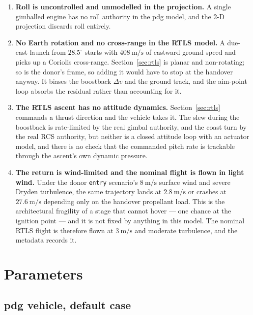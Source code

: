 \documentclass[11pt,a4paper]{article}
\newcommand{\code}[1]{\texttt{#1}}
\begin{document}
\begin{enumerate}
\item \textbf{Roll is uncontrolled and unmodelled in the projection.} A single
  gimballed engine has no roll authority in the pdg model, and the 2-D
  projection discards roll entirely.

\item \textbf{No Earth rotation and no cross-range in the RTLS model.} A due-east
  launch from $28.5^\circ$ starts with $408\ \mathrm{m/s}$ of eastward ground
  speed and picks up a Coriolis cross-range. Section~\ref{sec:rtls} is planar and
  non-rotating; so is the donor's frame, so adding it would have to stop at the
  handover anyway. It biases the boostback $\Delta v$ and the ground track, and
  the aim-point loop absorbs the residual rather than accounting for it.

\item \textbf{The RTLS ascent has no attitude dynamics.} Section~\ref{sec:rtls}
  commands a thrust direction and the vehicle takes it. The slew during the
  boostback is rate-limited by the real gimbal authority, and the coast turn by
  the real RCS authority, but neither is a closed attitude loop with an actuator
  model, and there is no check that the commanded pitch rate is trackable
  through the ascent's own dynamic pressure.

\item \textbf{The return is wind-limited and the nominal flight is flown in
  light wind.} Under the donor \code{entry} scenario's $8\ \mathrm{m/s}$ surface
  wind and severe Dryden turbulence, the same trajectory lands at
  $2.8\ \mathrm{m/s}$ or crashes at $27.6\ \mathrm{m/s}$ depending only on the
  handover propellant load. This is the architectural fragility of a stage that
  cannot hover --- one chance at the ignition point --- and it is not fixed by
  anything in this model. The nominal RTLS flight is therefore flown at
  $3\ \mathrm{m/s}$ and moderate turbulence, and the metadata records it.
\end{enumerate}

\section{Parameters}

\subsection{pdg vehicle, default case}
\end{document}
